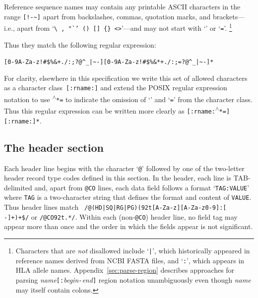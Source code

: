 \documentclass[10pt]{article}
\newcommand*{\cclass}[1]{{\rm\sf :#1:}}
\newcommand*{\caret}{\textsuperscript{$\wedge$}}
\begin{document}
Reference sequence names may contain any printable ASCII characters in the range {\tt [!-\verb:~:]} apart from backslashes, commas, quotation marks, and brackets---i.e., apart from `{\tt \verb:\:\,,\,"`'\,()\,[]\,\verb:{}:\,<>}'---and may not start with `{\tt *}' or `{\tt =}'.%
\footnote{Characters that are \emph{not} disallowed include `{\tt |}', which historically appeared in reference names derived from NCBI FASTA files, and `{\tt :}', which appears in HLA allele names.
Appendix~\ref{sec:parse-region} describes approaches for parsing \emph{name}{\tt [:}\emph{begin}{\tt -}\emph{end}{\tt ]} region notation unambiguously even though \emph{name} may itself contain colons.}

Thus they match the following regular expression:
\begin{center}
{\tt [\verb"0-9A-Za-z!#$%&+./:;?@^_|~-"][\verb"0-9A-Za-z!#$%&*+./:;=?@^_|~-"]*}
\end{center}

\newcommand*{\rnameRegexp}{[\cclass{rname}\caret*=][\cclass{rname}]*}

\noindent
For clarity, elsewhere in this specification we write this set of allowed characters as a character class~{\tt [\cclass{rname}]} and extend the POSIX regular expression notation to use {\tt\caret *=} to indicate the omission of `{\tt *}' and `{\tt =}' from the character class.
Thus this regular expression can be written more clearly as {\tt\rnameRegexp}.

\subsection{The header section}
Each header line begins with the character `{\tt @}' followed by
one of the two-letter header record type codes defined in this section.
In the header, each line is TAB-delimited and, apart from {\tt @CO} lines,
each data field follows a format `{\tt TAG:VALUE}' where {\tt TAG}
is a two-character string that defines the format and content of {\tt VALUE}.
Thus header lines match {\tt
  /@(HD|SQ|RG|PG)(\char92t[A-Za-z][A-Za-z0-9]:[
  -]+)+\$/} or {\tt /@CO\char92t.*/}.
Within each (non-{\tt @CO}) header line, no field tag may appear more than
once and the order in which the fields appear is not significant.
\end{document}
